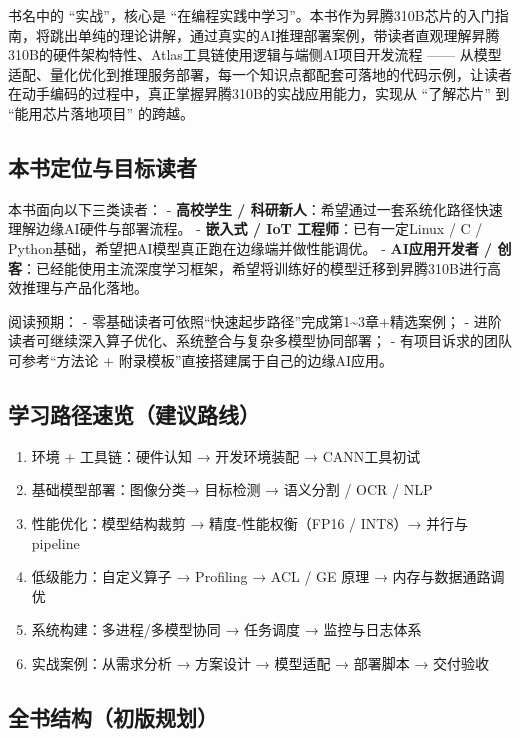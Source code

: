 书名中的 ``实战''，核心是
``在编程实践中学习''。本书作为昇腾310B芯片的入门指南，将跳出单纯的理论讲解，通过真实的AI推理部署案例，带读者直观理解昇腾310B的硬件架构特性、Atlas工具链使用逻辑与端侧AI项目开发流程
------
从模型适配、量化优化到推理服务部署，每一个知识点都配套可落地的代码示例，让读者在动手编码的过程中，真正掌握昇腾310B的实战应用能力，实现从
``了解芯片'' 到 ``能用芯片落地项目'' 的跨越。

\subsection*{本书定位与目标读者}\label{本书定位与目标读者}

本书面向以下三类读者： - \textbf{高校学生 /
科研新人}：希望通过一套系统化路径快速理解边缘AI硬件与部署流程。 -
\textbf{嵌入式 / IoT 工程师}：已有一定Linux / C /
Python基础，希望把AI模型真正跑在边缘端并做性能调优。 -
\textbf{AI应用开发者 /
创客}：已经能使用主流深度学习框架，希望将训练好的模型迁移到昇腾310B进行高效推理与产品化落地。

阅读预期： -
零基础读者可依照``快速起步路径''完成第1\textasciitilde3章+精选案例； -
进阶读者可继续深入算子优化、系统整合与复杂多模型协同部署； -
有项目诉求的团队可参考``方法论 +
附录模板''直接搭建属于自己的边缘AI应用。

\subsection*{学习路径速览（建议路线）}\label{学习路径速览建议路线}

\begin{enumerate}
\def\labelenumi{\arabic{enumi}.}
\tightlist
\item
  环境 + 工具链：硬件认知 → 开发环境装配 → CANN工具初试
\item
  基础模型部署：图像分类→ 目标检测 → 语义分割 / OCR / NLP
\item
  性能优化：模型结构裁剪 → 精度-性能权衡（FP16 / INT8）→ 并行与pipeline
\item
  低级能力：自定义算子 → Profiling → ACL / GE 原理 → 内存与数据通路调优
\item
  系统构建：多进程/多模型协同 → 任务调度 → 监控与日志体系
\item
  实战案例：从需求分析 → 方案设计 → 模型适配 → 部署脚本 → 交付验收
\end{enumerate}

\subsection*{全书结构（初版规划）}\label{全书结构初版规划}

